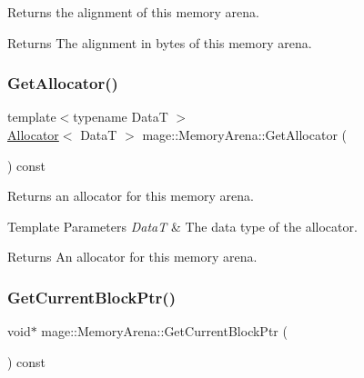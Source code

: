Returns the alignment of this memory arena.

\begin{DoxyReturn}{Returns}
The alignment in bytes of this memory arena. 
\end{DoxyReturn}
\mbox{\label{classmage_1_1_memory_arena_a722a884e077c903a586a6cb08ce98b24}} 
\subsubsection{\texorpdfstring{Get\+Allocator()}{GetAllocator()}}
{\footnotesize\ttfamily template$<$typename DataT $>$ \\
\mbox{\hyperlink{classmage_1_1_memory_arena_1_1_allocator}{Allocator}}$<$ DataT $>$ mage\+::\+Memory\+Arena\+::\+Get\+Allocator (\begin{DoxyParamCaption}{ }\end{DoxyParamCaption}) const\hspace{0.3cm}{\ttfamily [noexcept]}}

Returns an allocator for this memory arena.


\begin{DoxyTemplParams}{Template Parameters}
{\em DataT} & The data type of the allocator. \\
\hline
\end{DoxyTemplParams}
\begin{DoxyReturn}{Returns}
An allocator for this memory arena. 
\end{DoxyReturn}
\mbox{\label{classmage_1_1_memory_arena_a7bdbc9da32c1f8d49ce5d2f153870284}} 
\subsubsection{\texorpdfstring{Get\+Current\+Block\+Ptr()}{GetCurrentBlockPtr()}}
{\footnotesize\ttfamily void$\ast$ mage\+::\+Memory\+Arena\+::\+Get\+Current\+Block\+Ptr (\begin{DoxyParamCaption}{ }\end{DoxyParamCaption}) const\hspace{0.3cm}{\ttfamily [noexcept]}}

